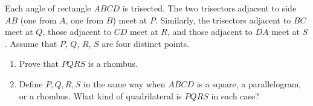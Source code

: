 Each angle of rectangle $ABCD$ is trisected. The two trisectors adjacent to side $AB$ (one from $A$, one from $B$) meet at $P$. Similarly, the trisectors adjacent to $BC$ meet at $Q$, those adjacent to $CD$ meet at $R$, and those adjacent to $DA$ meet at $S$. Assume that $P$, $Q$, $R$, $S$ are four distinct points.
\begin{enumerate}
\item[(a)] Prove that $PQRS$ is a rhombus.
\item[(b)] Define $P,Q,R,S$ in the same way when $ABCD$ is a square, a parallelogram, or a rhombus. What kind of quadrilateral is $PQRS$ in each case?
\end{enumerate}
